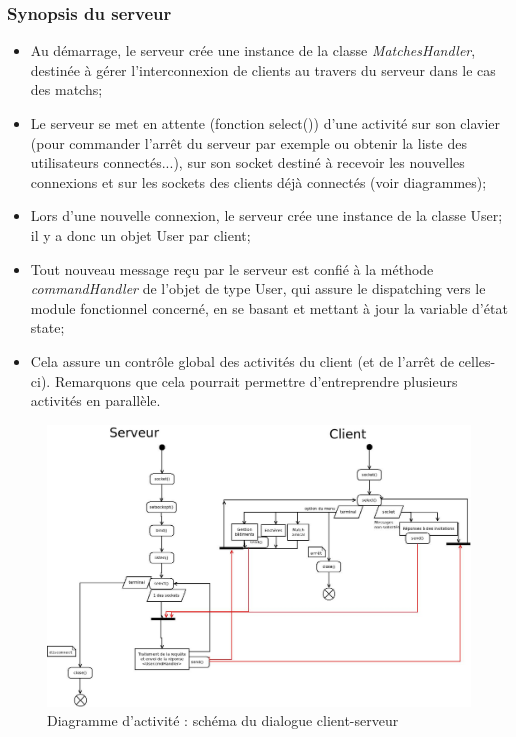\documentclass[a4paper,titlepage]{scrreprt}
\begin{document}
\subsubsection{Synopsis du serveur}
\begin{itemize}
  \item Au démarrage, le serveur crée une instance de la classe \emph{MatchesHandler}, destinée à gérer l'interconnexion
   de clients au travers du serveur dans le cas des matchs;
  \item Le serveur se met en attente (fonction select()) d'une activité sur son clavier
  (pour commander l'arrêt du serveur par exemple ou obtenir la liste des utilisateurs connectés...), sur
  son socket destiné à recevoir les nouvelles connexions et sur les sockets des clients déjà connectés (voir diagrammes);
  \item Lors d'une nouvelle connexion, le serveur crée une instance de la classe User; il y a donc un objet User par client;
  \item Tout nouveau message reçu par le serveur est confié à la méthode \emph{commandHandler} de l'objet de type User, qui assure le dispatching
  vers le module fonctionnel concerné, en se basant et mettant à jour la variable d'état state;
  \item Cela assure un contrôle global des activités du client (et de l'arrêt de celles-ci).
  Remarquons que cela pourrait permettre d'entreprendre plusieurs activités en parallèle.
\end{itemize}
    \begin{figure}[H]
    \center
    \includegraphics[scale=0.3]{uml/Client-serveur.jpeg}
    \caption{Diagramme d'activité : schéma du dialogue client-serveur} \label{diag-serveur}
    \end{figure}
\end{document}
